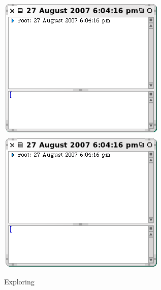 \documentclass[a4paper,10pt,twoside]{book}
\begin{document}
\begin{figure}[tbp]
\begin{minipage}{0.48\textwidth}
	\begin{center}
	\ifluluelse
		{\includegraphics[width=\textwidth]{exploreTimeStampNow}}
		{\includegraphics[scale=0.7]{exploreTimeStampNow}}
	\end{center}
	\caption{Exploring }
	\label{fig:exploreTimeStampNow}
\end{minipage}
\hfill
\begin{minipage}{0.48\textwidth}
	\begin{center}
	\ifluluelse

\end{center}
\end{minipage}
\end{figure}
\end{document}
